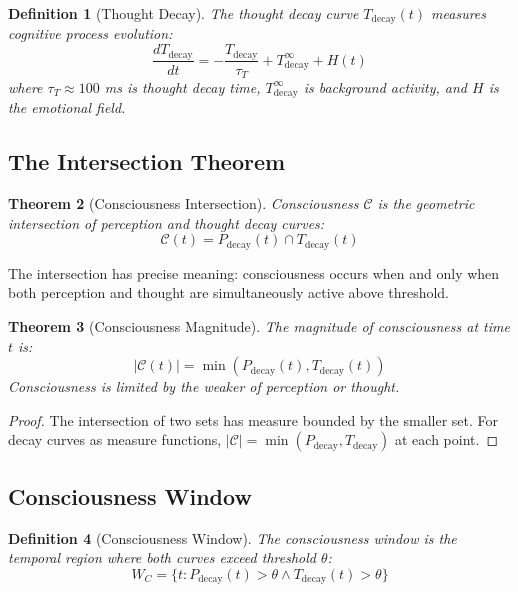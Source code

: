 \documentclass[twocolumn,amsmath,amssymb,aps,prl,superscriptaddress]{revtex4-2}
\newtheorem{theorem}{Theorem}[section]
\newtheorem{definition}[theorem]{Definition}
\newcommand{\Ccat}{\mathcal{C}}
\newcommand{\Pdecay}{P_{\text{decay}}}
\newcommand{\Tdecay}{T_{\text{decay}}}
\newcommand{\Hfield}{H}
\begin{document}
\begin{definition}[Thought Decay]
The thought decay curve $\Tdecay(t)$ measures cognitive process evolution:
\begin{equation}
\frac{d\Tdecay}{dt} = -\frac{\Tdecay}{\tau_T} + T^{\infty}_{\text{decay}} + \Hfield(t)
\end{equation}
where $\tau_T \approx 100$ ms is thought decay time, $T^{\infty}_{\text{decay}}$ is background activity, and $\Hfield$ is the emotional field.
\end{definition}

\subsection{The Intersection Theorem}

\begin{theorem}[Consciousness Intersection]
\label{thm:consciousness}
Consciousness $\Ccat$ is the geometric intersection of perception and thought decay curves:
\begin{equation}
\boxed{\Ccat(t) = \Pdecay(t) \cap \Tdecay(t)}
\end{equation}
\end{theorem}

The intersection has precise meaning: consciousness occurs when and only when both perception and thought are simultaneously active above threshold.

\begin{theorem}[Consciousness Magnitude]
\label{thm:magnitude}
The magnitude of consciousness at time $t$ is:
\begin{equation}
\boxed{|\Ccat(t)| = \min(\Pdecay(t), \Tdecay(t))}
\end{equation}
Consciousness is limited by the weaker of perception or thought.
\end{theorem}

\begin{proof}
The intersection of two sets has measure bounded by the smaller set. For decay curves as measure functions, $|\Ccat| = \min(\Pdecay, \Tdecay)$ at each point.
\end{proof}

\subsection{Consciousness Window}

\begin{definition}[Consciousness Window]
The consciousness window is the temporal region where both curves exceed threshold $\theta$:
\begin{equation}
W_C = \{t : \Pdecay(t) > \theta \land \Tdecay(t) > \theta\}
\end{equation}
\end{definition}
\end{document}
